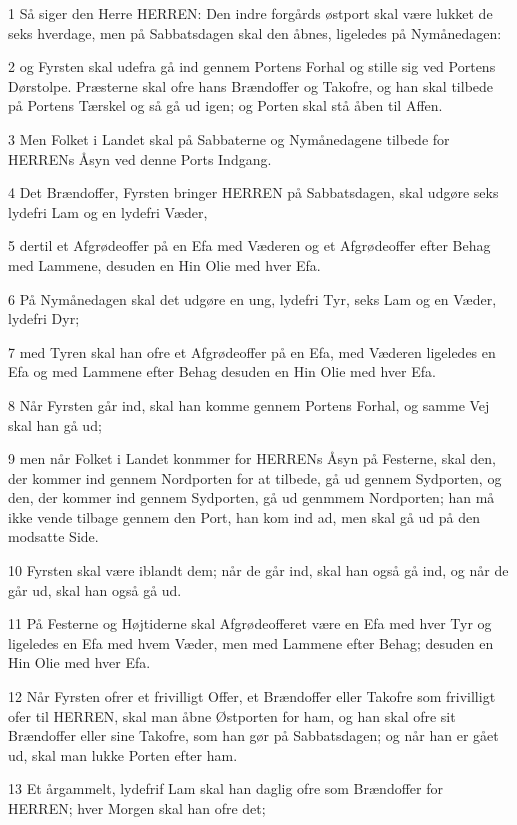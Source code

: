 \par 1 Så siger den Herre HERREN: Den indre forgårds østport skal være lukket de seks hverdage, men på Sabbatsdagen skal den åbnes, ligeledes på Nymånedagen:
\par 2 og Fyrsten skal udefra gå ind gennem Portens Forhal og stille sig ved Portens Dørstolpe. Præsterne skal ofre hans Brændoffer og Takofre, og han skal tilbede på Portens Tærskel og så gå ud igen; og Porten skal stå åben til Affen.
\par 3 Men Folket i Landet skal på Sabbaterne og Nymånedagene tilbede for HERRENs Åsyn ved denne Ports Indgang.
\par 4 Det Brændoffer, Fyrsten bringer HERREN på Sabbatsdagen, skal udgøre seks lydefri Lam og en lydefri Væder,
\par 5 dertil et Afgrødeoffer på en Efa med Væderen og et Afgrødeoffer efter Behag med Lammene, desuden en Hin Olie med hver Efa.
\par 6 På Nymånedagen skal det udgøre en ung, lydefri Tyr, seks Lam og en Væder, lydefri Dyr;
\par 7 med Tyren skal han ofre et Afgrødeoffer på en Efa, med Væderen ligeledes en Efa og med Lammene efter Behag desuden en Hin Olie med hver Efa.
\par 8 Når Fyrsten går ind, skal han komme gennem Portens Forhal, og samme Vej skal han gå ud;
\par 9 men når Folket i Landet konmmer for HERRENs Åsyn på Festerne, skal den, der kommer ind gennem Nordporten for at tilbede, gå ud gennem Sydporten, og den, der kommer ind gennem Sydporten, gå ud genmmem Nordporten; han må ikke vende tilbage gennem den Port, han kom ind ad, men skal gå ud på den modsatte Side.
\par 10 Fyrsten skal være iblandt dem; når de går ind, skal han også gå ind, og når de går ud, skal han også gå ud.
\par 11 På Festerne og Højtiderne skal Afgrødeofferet være en Efa med hver Tyr og ligeledes en Efa med hvem Væder, men med Lammene efter Behag; desuden en Hin Olie med hver Efa.
\par 12 Når Fyrsten ofrer et frivilligt Offer, et Brændoffer eller Takofre som frivilligt ofer til HERREN, skal man åbne Østporten for ham, og han skal ofre sit Brændoffer eller sine Takofre, som han gør på Sabbatsdagen; og når han er gået ud, skal man lukke Porten efter ham.
\par 13 Et årgammelt, lydefrif Lam skal han daglig ofre som Brændoffer for HERREN; hver Morgen skal han ofre det;
